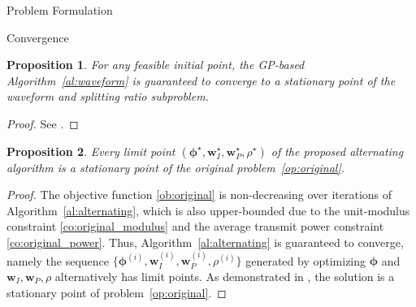 \documentclass[journal]{IEEEtran}
\newtheorem{proposition}{Proposition}
\begin{document}
\begin{section}{Problem Formulation}
\begin{subsection}{Convergence}
			\begin{proposition}\label{pr:waveform}
				For any feasible initial point, the GP-based Algorithm~\ref{al:waveform} is guaranteed to converge to a stationary point of the waveform and splitting ratio subproblem.
			\end{proposition}

			\begin{proof}\label{pf:waveform}
				See \cite{Clerckx2016a,Clerckx2018b}.
			\end{proof}

			\begin{proposition}\label{pr:ao}
				Every limit point $(\boldsymbol{\phi}^{\star},\boldsymbol{w}_I^{\star},\boldsymbol{w}_P^{\star},\rho^{\star})$ of the proposed alternating algorithm is a stationary point of the original problem~\ref{op:original}.
			\end{proposition}

			\begin{proof}\label{pf:ao}
				The objective function \ref{ob:original} is non-decreasing over iterations of Algorithm~\ref{al:alternating}, which is also upper-bounded due to the unit-modulus constraint \ref{co:original_modulus} and the average transmit power constraint \ref{co:original_power}. Thus, Algorithm~\ref{al:alternating} is guaranteed to converge, namely the sequence $\{\boldsymbol{\phi}^{(i)},\boldsymbol{w}_I^{(i)},\boldsymbol{w}_P^{(i)},\rho^{(i)}\}$ generated by optimizing $\boldsymbol{\phi}$ and $\boldsymbol{w}_I,\boldsymbol{w}_P,\rho$ alternatively has limit points. As demonstrated in \cite{Grippo2000}, the solution is a stationary point of problem~\ref{op:original}.
			\end{proof}
		\end{subsection}
	\end{section}
\end{document}
